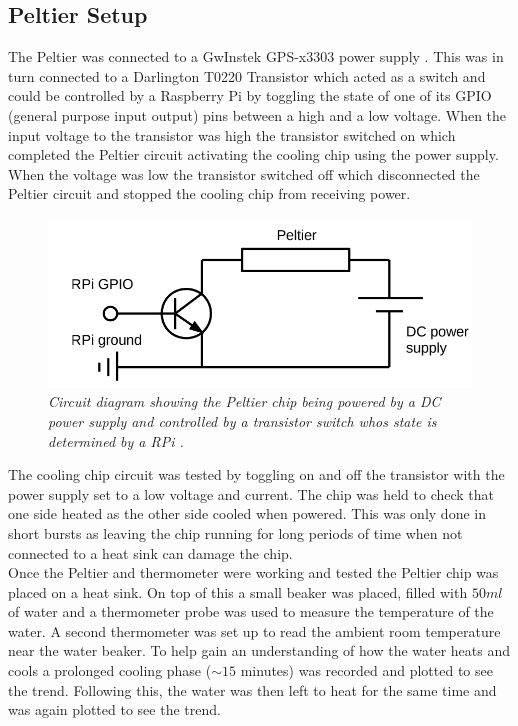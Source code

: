 \documentclass[10pt]{article}
\begin{document}
\subsection*{Peltier Setup}
The Peltier was connected to a GwInstek GPS-x3303 power supply \cite{powe_sup}. This was in turn connected to a Darlington T0220 Transistor \cite{trans} which acted as a switch and could be controlled by a Raspberry Pi by toggling the state of one of its GPIO (general purpose input output) pins between a high and a low voltage. When the input voltage to the transistor was high the transistor switched on which completed the Peltier circuit activating the cooling chip using the power supply. When the voltage was low the transistor switched off which disconnected the Peltier circuit and stopped the cooling chip from receiving power.\\

\begin{figure}[h!]
    \centering
    \includegraphics[scale=0.5]{circuit.png}
    \caption{\it{Circuit diagram showing the Peltier chip being powered by a DC power supply and controlled by a transistor switch whos state is determined by a RPi \cite{course_notes}.}}
    \label{fig:circuit}
\end{figure}

The cooling chip circuit was tested by toggling on and off the transistor with the power supply set to a low voltage and current. The chip was held to check that one side heated as the other side cooled when powered. This was only done in short bursts as leaving the chip running for long periods of time when not connected to a heat sink can damage the chip. \\

Once the Peltier and thermometer were working and tested the Peltier chip was placed on a heat sink. On top of this a small beaker was placed, filled with $50ml$ of water and a thermometer probe was used to measure the temperature of the water. A second thermometer was set up to read the ambient room temperature near the water beaker. To help gain an understanding of how the water heats and cools a prolonged cooling phase ($\sim15$ minutes) was recorded and plotted to see the trend. Following this, the water was then left to heat for the same time and was again plotted to see the trend.
\end{document}
